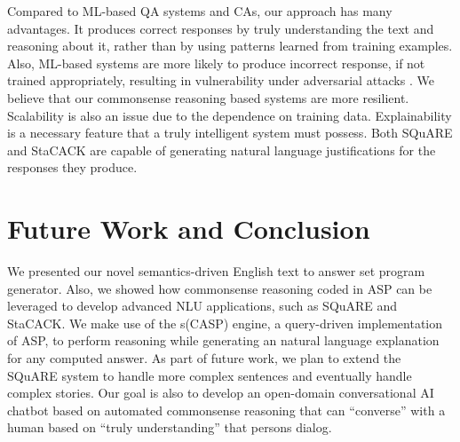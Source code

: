 \documentclass[letterpaper]{article}
\begin{document}
Compared to ML-based QA systems and CAs, our approach has many advantages. It produces correct responses by truly understanding the text and reasoning about it, rather than by using  patterns learned from training examples. Also, ML-based systems are more likely to produce incorrect response, if not trained appropriately, resulting in vulnerability under adversarial attacks \cite{ad_attack}. We believe that our commonsense reasoning based systems are more resilient. Scalability is also an issue due to the dependence on training data. Explainability is a necessary feature that a truly intelligent system must possess. Both SQuARE and StaCACK are capable of generating natural language justifications for the responses they produce.


\section{Future Work and Conclusion}
We presented our novel semantics-driven English text to answer set program generator. Also, we showed how commonsense reasoning coded in ASP can be leveraged to develop advanced NLU applications, such as SQuARE and StaCACK. We make use of the s(CASP) engine, a query-driven implementation of ASP, to perform reasoning while generating an natural language explanation for any computed answer. As part of future work, we plan to extend the SQuARE system to handle more complex sentences and eventually handle complex stories. Our goal is also to develop an open-domain conversational AI chatbot based on automated commonsense reasoning that can ``converse'' with a human based on ``truly understanding'' that persons dialog. 


\balance


\end{document}
